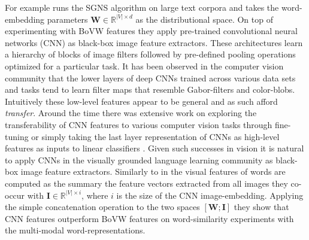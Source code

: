 For example \cite{kiela2014learning} runs the SGNS algorithm
on large text corpora and takes the word-embedding parameters
$\mathbf{W} \in \mathbb{R}^{|V| \times d}$ as the distributional space.
On top of experimenting with BoVW features they apply pre-trained convolutional
neural networks (CNN) as black-box image
feature extractors. These architectures learn a hierarchy of blocks of image filters followed by
pre-defined pooling operations optimized for a particular task.
It has been observed in the computer vision community that the lower layers of
deep CNNs trained across various data sets and tasks tend to learn filter maps
that resemble Gabor-filters and color-blobs. Intuitively these low-level features appear to be general
and as such afford \emph{transfer}. Around the time there was extensive work on exploring the transferability
of CNN features to various computer vision tasks through fine-tuning
 \citep{donahue2014decaf,oquab2014learning} or simply taking the last layer representation of CNNs
as high-level features as inputs to linear classifiers \citep{girshick2014rich,sharif2014cnn}.
Given such successes in vision it is natural to apply CNNs in the visually grounded language learning
community as black-box image feature extractors. Similarly to \cite{bruni2014multimodal} in
\cite{kiela2014learning} the visual features of words are computed as the summary the feature vectors
extracted from all images they co-occur with $\mathbf{I} \in \mathbb{R}^{|V| \times i}$, where $i$ is
the size of the CNN image-embedding.
Applying the simple concatenation operation to the two spaces $[\mathbf{W};\mathbf{I}]$
they show that CNN features outperform BoVW features on word-similarity
experiments with the multi-modal word-representations.


